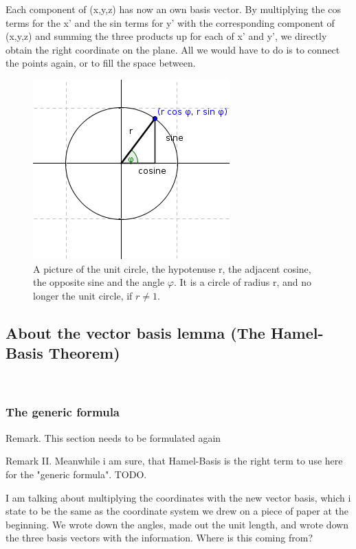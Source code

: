 \documentclass[a4paper]{article}
\begin{document}
Each component of (x,y,z) has now an own basis vector. By multiplying the cos terms for the x' and the sin terms for y' with the corresponding component of (x,y,z) and summing the three products up for each of x' and y', we directly obtain the right coordinate on the plane. All we would have to do is to connect the points again, or to fill the space between. 

\begin{figure}[ht]
\includegraphics[scale=2]{unitcircle.png}
\caption{A picture of the unit circle, the hypotenuse r, the adjacent cosine, the opposite sine and the angle $\varphi$. It is a circle of radius r, and no longer the unit circle, if $r \neq 1$.}
\end{figure}

\subsection{About the vector basis lemma (The Hamel-Basis Theorem)}\\

\subsubsection{The generic formula}

Remark. This section needs to be formulated again

Remark II. Meanwhile i am sure, that Hamel-Basis is the right term to use here for the "generic formula". TODO.

I am talking about multiplying the coordinates with the new vector basis, which i state to be the same as the coordinate system we drew on a piece of paper at the beginning. We wrote down the angles, made out the unit length, and wrote down the three basis vectors with the information. Where is this coming from?\\
\end{document}
